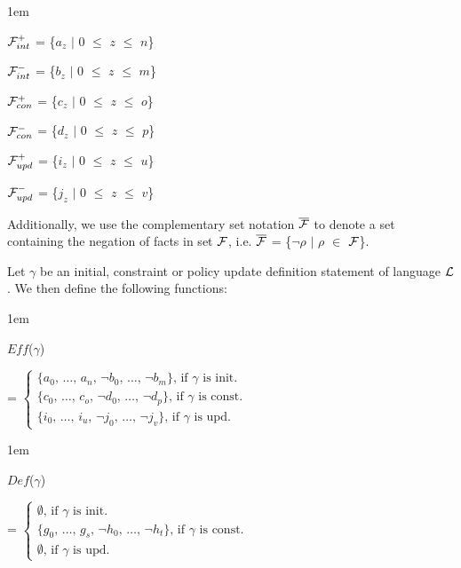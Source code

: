 \documentclass[global,twocolumn,draft]{svjour}
\newenvironment{vquote}
  {\begin{list}{}{\leftmargin 1em}\item[]}
  {\end{list}}
\begin{document}
    \begin{vquote}
      ${\cal F}^{+}_{int}$ = \{$a_{z}$ $\mid$ $0$ $\leq$ $z$ $\leq$ $n$\}

      ${\cal F}^{-}_{int}$ = \{$b_{z}$ $\mid$ $0$ $\leq$ $z$ $\leq$ $m$\}

      ${\cal F}^{+}_{con}$ = \{$c_{z}$ $\mid$ $0$ $\leq$ $z$ $\leq$ $o$\}

      ${\cal F}^{-}_{con}$ = \{$d_{z}$ $\mid$ $0$ $\leq$ $z$ $\leq$ $p$\}

      ${\cal F}^{+}_{upd}$ = \{$i_{z}$ $\mid$ $0$ $\leq$ $z$ $\leq$ $u$\}

      ${\cal F}^{-}_{upd}$ = \{$j_{z}$ $\mid$ $0$ $\leq$ $z$ $\leq$ $v$\}
    \end{vquote}

    Additionally, we use the complementary set notation
    $\overline{{\cal F}}$ to denote a set containing the negation of
    facts in set ${\cal F}$, i.e. $\overline{{\cal F}}$ =
    \{$\lnot\rho$ $\mid$ $\rho$ $\in$ ${\cal F}$\}.

    Let $\gamma$ be an initial, constraint or policy update definition
    statement of language ${\cal L}$. We then define the following functions:

    \begin{vquote}
      $Eff$($\gamma$)

      =
      \begin{math}
        \begin{cases}
          \mbox{\{$a_{0}$, \ldots, $a_{n}$, $\lnot$$b_{0}$, \ldots, $\lnot$$b_{m}$\}, if $\gamma$ is init.} \\
          \mbox{\{$c_{0}$, \ldots, $c_{o}$, $\lnot$$d_{0}$, \ldots, $\lnot$$d_{p}$\}, if $\gamma$ is const.} \\
          \mbox{\{$i_{0}$, \ldots, $i_{u}$, $\lnot$$j_{0}$, \ldots, $\lnot$$j_{v}$\}, if $\gamma$ is upd.}
        \end{cases}
      \end{math}
    \end{vquote}

    \begin{vquote}
      $Def$($\gamma$)

      =
      \begin{math}
        \begin{cases}
          \mbox{$\emptyset$, if $\gamma$ is init.} \\
          \mbox{\{$g_{0}$, \ldots, $g_{s}$, $\lnot$$h_{0}$, \ldots, $\lnot$$h_{t}$\}, if $\gamma$ is const.} \\
          \mbox{$\emptyset$, if $\gamma$ is upd.}
        \end{cases}
      \end{math}
    \end{vquote}
\end{document}
